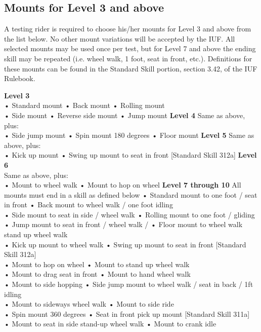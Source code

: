 \subsection{Mounts for Level 3 and above}
A testing rider is required to choose his/her mounts for Level 3 and above from the list below. No other mount
variations will be accepted by the IUF. All selected mounts may be used once per test, but for Level 7 and above the
ending skill may be repeated (i.e. wheel walk, 1 foot, seat in front, etc.). Definitions for these mounts can be found in
the Standard Skill portion, section 3.42, of the IUF Rulebook.

\textbf{Level 3}\\
• Standard mount • Back mount • Rolling mount\\
• Side mount • Reverse side mount • Jump mount
\textbf{Level 4}
Same as above, plus:\\
• Side jump mount • Spin mount 180 degrees • Floor mount
\textbf{Level 5}
Same as above, plus:\\
• Kick up mount • Swing up mount to seat in front [Standard Skill 312a]
\textbf{Level 6}\\
Same as above, plus:\\
• Mount to wheel walk • Mount to hop on wheel  
\textbf{Level 7 through 10}
All mounts must end in a skill as defined below
• Standard mount to one foot / seat in front • Back mount to wheel walk / one foot idling\\
• Side mount to seat in side / wheel walk • Rolling mount to one foot / gliding\\
• Jump mount to seat in front / wheel walk /
• Floor mount to wheel walk
 stand up wheel walk\\
• Kick up mount to wheel walk
• Swing up mount to seat in front [Standard Skill 312a]\\
• Mount to hop on wheel
• Mount to stand up wheel walk\\
• Mount to drag seat in front
• Mount to hand wheel walk\\
• Mount to side hopping
• Side jump mount to wheel walk / seat in back / 1ft idling\\
• Mount to sideways wheel walk
• Mount to side ride\\
• Spin mount 360 degrees
• Seat in front pick up mount [Standard Skill 311a]\\
• Mount to seat in side stand-up wheel walk
• Mount to crank idle\\

